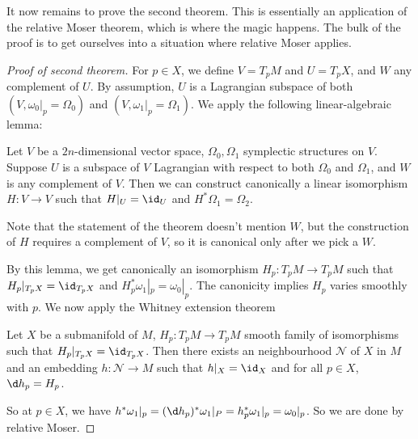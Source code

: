 \documentclass[a4paper]{article}
\begin{document}
It now remains to prove the second theorem. This is essentially an application of the relative Moser theorem, which is where the magic happens. The bulk of the proof is to get ourselves into a situation where relative Moser applies.
\begin{proof}[Proof of second theorem]
  For $p \in X$, we define $V = T_p M$ and $U = T_p X$, and $W$ any complement of $U$. By assumption, $U$ is a Lagrangian subspace of both $(V, \omega_0|_p = \Omega_0)$ and $(V, \omega_1|_p = \Omega_1)$. We apply the following linear-algebraic lemma:

  \begin{lemma}
    Let $V$ be a $2n$-dimensional vector space, $\Omega_0, \Omega_1$ symplectic structures on $V$. Suppose $U$ is a subspace of $V$ Lagrangian with respect to both $\Omega_0$ and $\Omega_1$, and $W$ is any complement of $V$. Then we can construct canonically a linear isomorphism $H: V \to V$ such that $H|_U = \id_U$ and $H^* \Omega_1 = \Omega_2$.

    Note that the statement of the theorem doesn't mention $W$, but the construction of $H$ requires a complement of $V$, so it is canonical only after we pick a $W$. %
  \end{lemma}
  By this lemma, we get canonically an isomorphism $H_p: T_p M \to T_p M$ such that $H_p|_{T_p X} = \id_{T_p X}$ and $H_p^* \omega_1|_p = \omega_0|_p$. The canonicity implies $H_p$ varies smoothly with $p$. We now apply the Whitney extension theorem
  \begin{thm}
    Let $X$ be a submanifold of $M$, $H_p: T_p M \to T_p M$ smooth family of isomorphisms such that $H_p|_{T_p X} = \id_{T_p X}$. Then there exists an neighbourhood $\mathcal{N}$ of $X$ in $M$ and an embedding $h: \mathcal{N} \to M$ such that $h|_X = \id_X$ and for all $p \in X$, $\d h_p = H_p$.
  \end{thm}
  So at $p \in X$, we have $h^* \omega_1|_p = (\d h_p)^*\omega_1|_P = h_p^* \omega_1|_p = \omega_0|_p$. So we are done by relative Moser.
\end{proof}

\end{document}
